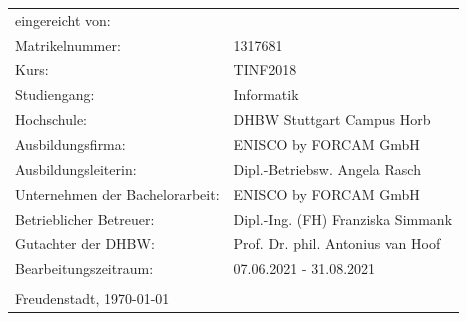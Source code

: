 \begin{tabular}{ll}
    eingereicht von:\hspace{1cm} & \author{}
    \tabularnewline
    Matrikelnummer: & 1317681
    \tabularnewline
    Kurs: & TINF2018
    \tabularnewline
    Studiengang: & Informatik
    \tabularnewline
    Hochschule: & DHBW Stuttgart Campus Horb
    \tabularnewline
    Ausbildungsfirma: & ENISCO by FORCAM GmbH
    \tabularnewline
    Ausbildungsleiterin: & Dipl.-Betriebsw. Angela Rasch
    \tabularnewline
    Unternehmen der Bachelorarbeit: & ENISCO by FORCAM GmbH
    \tabularnewline
    Betrieblicher Betreuer: & Dipl.-Ing. (FH) Franziska Simmank
    \tabularnewline
    Gutachter der DHBW: & Prof. Dr. phil. Antonius van Hoof
    \tabularnewline
    Bearbeitungszeitraum: & 07.06.2021 - 31.08.2021
    \tabularnewline
    \tabularnewline
    \multicolumn{2}{l}{Freudenstadt, \today}
    \tabularnewline
\end{tabular}